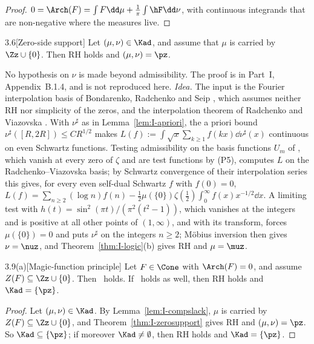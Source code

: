 \begin{proof}
$0=\Arch(F)=\int F\dd\mu+\frac1\pi\int\hF\dd\nu$, with continuous integrands that are non-negative where the measures live.
\end{proof}

\begin{Itheorem}{3.6}[Zero-side support]\label{thm:I-zerosupport}
Let $(\mu,\nu)\in\Kad$, and assume that $\mu$ is carried by $\Zz\cup\{0\}$. Then RH holds and $(\mu,\nu)=\pz$.
\end{Itheorem}

No hypothesis on $\nu$ is made beyond admissibility. The proof is in Part~I, Appendix~B.1.4, and is not reproduced here. \emph{Idea.} The input is the Fourier
interpolation basis of Bondarenko, Radchenko and Seip \cite[Theorem~1.1]{BRS}, which assumes neither RH nor simplicity of the zeros, and
the interpolation theorem of Radchenko and Viazovska \cite{RV19}. With $\nu^\sharp$ as in Lemma~\ref{lem:I-apriori}, the
a priori bound $\nu^\sharp([R,2R])\le CR^{1/2}$ makes $L(f):=\int\sqrt x\sum_{k\ge1}f(kx)\dd\nu^\sharp(x)$ continuous on even
Schwartz functions. Testing admissibility on the basis functions $U_m$ of \cite{BRS}, which vanish at every zero of $\zeta$ and are test
functions by (P5), computes $L$ on
the Radchenko--Viazovska basis; by Schwartz convergence of their interpolation series this gives, for every even self-dual Schwartz $f$ with
$f(0)=0$, $L(f)=\sum_{n\ge2}(\log n)f(n)-\frac12\mu(\{0\})\zeta(\frac12)\int_0^\infty f(x)x^{-1/2}\dd x$. A limiting test with
$h(t)=\sin^2(\pi t)/(\pi^2(t^2-1))$, which vanishes at the integers and is positive at all other points of $(1,\infty)$, and with its
transform, forces $\mu(\{0\})=0$ and puts $\nu^\sharp$ on the integers $n\ge2$; M\"obius inversion then gives $\nu=\nuz$, and
Theorem~\ref{thm:I-logic}(b) gives RH and $\mu=\muz$.

\begin{Icorollary}{3.9(a)}[Magic-function principle]\label{cor:I-magic}
Let $F\in\Cone$ with $\Arch(F)=0$, and assume $Z(F)\subseteq\Zz\cup\{0\}$. Then \condU\ holds. If \condE\ holds as well, then RH holds and
$\Kad=\{\pz\}$.
\end{Icorollary}

\begin{proof}
Let $(\mu,\nu)\in\Kad$. By Lemma~\ref{lem:I-compslack}, $\mu$ is carried by $Z(F)\subseteq\Zz\cup\{0\}$, and Theorem~\ref{thm:I-zerosupport}
gives RH and $(\mu,\nu)=\pz$. So $\Kad\subseteq\{\pz\}$; if moreover $\Kad\ne\emptyset$, then RH holds and $\Kad=\{\pz\}$.
\end{proof}

